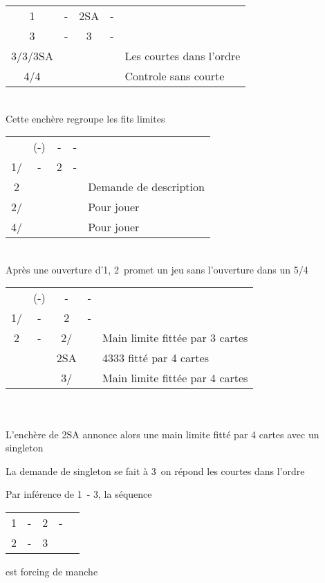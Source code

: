 \documentclass[a4paper, oneside, 11pt]{report}
\begin{document}
		\begin{tabular}{cccc|l}
		1\coeur & - & 2SA & - &\\
		3\trefle & - & 3\carreau & - &\\
		3\coeur/3\pique/3SA &&&& Les courtes dans l'ordre\\
		4\trefle/4\carreau &&&& Controle sans courte\\
		\end{tabular}\\
	
\newpage
		Cette enchère regroupe les fits limites\\
		\begin{tabular}{cccc|l}
		& (-) & - & - &\\
		1\coeur/\pique & - & 2\trefle & - &\\
		2\carreau &&&& Demande de description\\
		2\coeur/\pique &&&& Pour jouer\\
		4\coeur/\pique &&&& Pour jouer\\
		\end{tabular}\\
		Après une ouverture d'1\pique, 2\coeur\ promet un jeu sans l'ouverture dans un 5/4\\

		\begin{tabular}{cccc|l}
		& (-) & - & - &\\
		1\coeur/\pique & - & 2\trefle & - &\\
		2\carreau & - & 2\coeur/\pique && Main limite fittée par 3 cartes\\
		&& 2SA && 4333 fitté par 4 cartes\\
		&& 3\coeur/\pique && Main limite fittée par 4 cartes\\
		\end{tabular}\\\\
		
		L'enchère de 2SA annonce alors une main limite fitté par 4 cartes avec un singleton
		
		La demande de singleton se fait à 3\trefle\ on répond les courtes dans l'ordre\\

	
		Par inférence de 1\pique\ - 3\coeur, la séquence 		
		\begin{tabular}{cccc|l}
		1\pique & - & 2\coeur & - &\\
		2\pique & - & 3\coeur && \\
		\end{tabular}
		est forcing de manche\\\\
		
\end{document}
